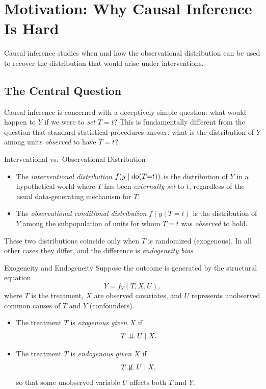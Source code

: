\documentclass[master.tex]{subfiles}
\begin{document}
\section{Motivation: Why Causal Inference Is Hard}

Causal inference studies when and how the observational distribution can be used to recover the distribution that would arise under interventions.

\subsection{The Central Question}

Causal inference is concerned with a deceptively simple question: what would
happen to $Y$ if we were to \emph{set} $T = t$?  This is fundamentally
different from the question that standard statistical procedures answer:
what is the distribution of $Y$ among units \emph{observed} to have $T = t$?

\begin{defn}{Interventional vs.\ Observational Distribution}
\begin{itemize}
  \item The \emph{interventional distribution} $f(y \mid \mathrm{do}(T{=}t))$ is
        the distribution of $Y$ in a hypothetical world where $T$ has been
        \emph{externally set} to $t$, regardless of the usual
        data-generating mechanism for $T$.
  \item The \emph{observational conditional distribution} $f(y \mid T{=}t)$
        is the distribution of $Y$ among the subpopulation of units for
        whom $T = t$ was \emph{observed} to hold.
\end{itemize}
These two distributions coincide only when $T$ is randomized (exogenous).
In all other cases they differ, and the difference is \emph{endogeneity bias}.
\end{defn}


\begin{defn}{Exogeneity and Endogeneity} 
Suppose the outcome is generated by the structural equation
\[
Y = f_Y(T, X, U),
\]
where $T$ is the treatment, $X$ are observed covariates, and $U$ represents
unobserved common causes of $T$ and $Y$ (confounders).
\begin{itemize}
\item The treatment \(T\) is \emph{exogenous given \(X\)} if
\[
T \perp\!\!\!\perp U \mid X .
\]
\item The treatment \(T\) is \emph{endogenous given \(X\)} if
\[
T \not\!\perp\!\!\!\perp U \mid X ,
\]
so that some unobserved variable \(U\) affects both \(T\) and \(Y\).
\end{itemize}
\end{defn}
\end{document}

